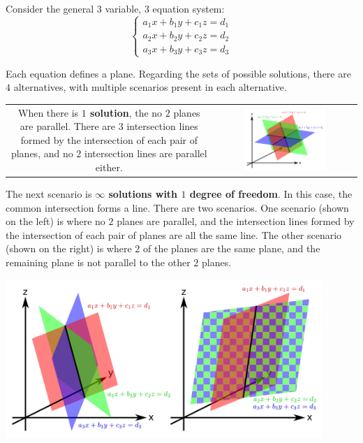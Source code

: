 \documentclass{article}
\begin{document}
Consider the general \(3\) variable, \(3\) equation system:
\[\left\{\begin{array}{c}
a_1 x + b_1 y + c_1 z = d_1 \\
a_2 x + b_2 y + c_2 z = d_2 \\
a_3 x + b_3 y + c_3 z = d_3
\end{array}\right.\]

Each equation defines a plane. Regarding the sets of possible solutions, there are \(4\) alternatives, with multiple scenarios present in each alternative.

\begin{tabular}{cc}
\parbox{0.4\textwidth}{
When there is {\bf \(1\) solution}, the no \(2\) planes are parallel. There are \(3\) intersection lines formed by the intersection of each pair of planes, and no \(2\) intersection lines are parallel either. 
} & \parbox{0.6\textwidth}{
\includegraphics[width = 0.6\textwidth]{3_variable_system_1_solution}
}
\end{tabular}

The next scenario is {\bf \(\infty\) solutions with \(1\) degree of freedom}. In this case, the common intersection forms a line. There are two scenarios. One scenario (shown on the left) is where no \(2\) planes are parallel, and the intersection lines formed by the intersection of each pair of planes are all the same line. The other scenario (shown on the right) is where \(2\) of the planes are the same plane, and the remaining plane is not parallel to the other \(2\) planes.

\includegraphics[width = 0.9\textwidth]{3_variable_system_inf_solutions}  
\end{document}
